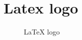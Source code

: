\section{Latex logo}\label{sec:logo_latex}


\begin{figure}[h]
  \centering
  	\def\svgwidth{0.5\textwidth}
  
  \caption{LaTeX logo}
  \label{fig:latex}
\end{figure}